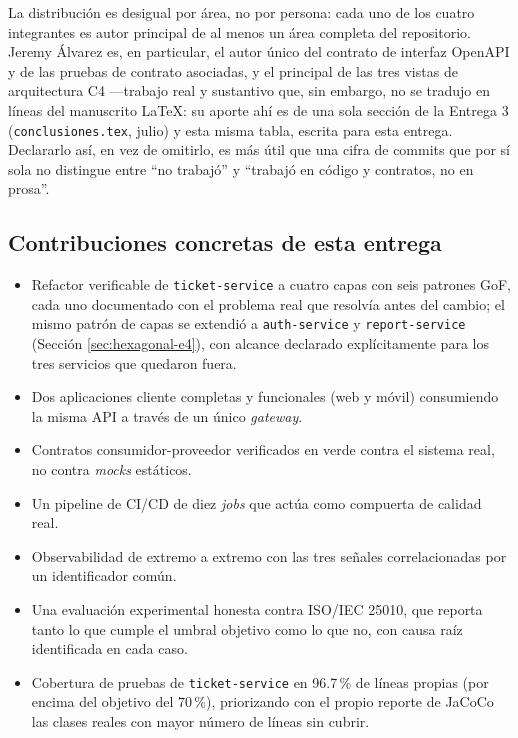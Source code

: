 La distribución es desigual por área, no por persona: cada uno de los cuatro integrantes es autor
principal de al menos un área completa del repositorio. Jeremy Álvarez es, en particular, el autor
único del contrato de interfaz OpenAPI y de las pruebas de contrato asociadas, y el principal de
las tres vistas de arquitectura C4 —trabajo real y sustantivo que, sin embargo, no se tradujo en
líneas del manuscrito LaTeX: su aporte ahí es de una sola sección de la Entrega 3
(\texttt{conclusiones.tex}, julio) y esta misma tabla, escrita para esta entrega. Declararlo así,
en vez de omitirlo, es más útil que una cifra de commits que por sí sola no distingue entre
``no trabajó'' y ``trabajó en código y contratos, no en prosa''.

\subsection{Contribuciones concretas de esta entrega}

\begin{itemize}[nosep]
  \item Refactor verificable de \texttt{ticket-service} a cuatro capas con seis patrones GoF,
        cada uno documentado con el problema real que resolvía antes del cambio; el mismo patrón
        de capas se extendió a \texttt{auth-service} y \texttt{report-service} (Sección
        \ref{sec:hexagonal-e4}), con alcance declarado explícitamente para los tres servicios que
        quedaron fuera.
  \item Dos aplicaciones cliente completas y funcionales (web y móvil) consumiendo la misma API a
        través de un único \emph{gateway}.
  \item Contratos consumidor-proveedor verificados en verde contra el sistema real, no contra
        \emph{mocks} estáticos.
  \item Un pipeline de CI/CD de diez \emph{jobs} que actúa como compuerta de calidad real.
  \item Observabilidad de extremo a extremo con las tres señales correlacionadas por un
        identificador común.
  \item Una evaluación experimental honesta contra ISO/IEC 25010, que reporta tanto lo que
        cumple el umbral objetivo como lo que no, con causa raíz identificada en cada caso.
  \item Cobertura de pruebas de \texttt{ticket-service} en 96.7\,\% de líneas propias (por
        encima del objetivo del 70\,\%), priorizando con el propio reporte de JaCoCo las clases
        reales con mayor número de líneas sin cubrir.
\end{itemize}

